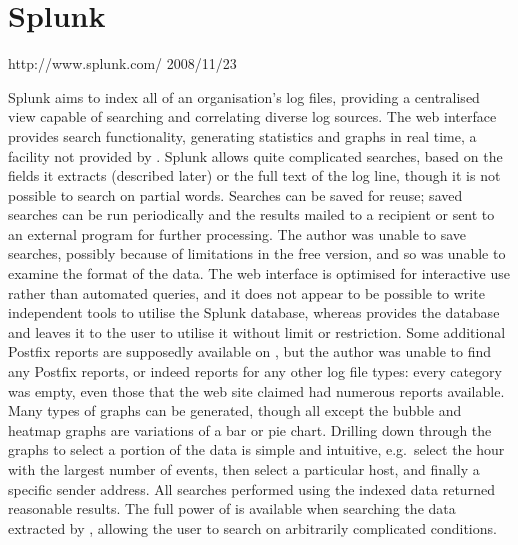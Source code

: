\section{Splunk}

\label{Splunk review}

{http://www.splunk.com/}
{2008/11/23}

Splunk aims to index all of an organisation's log files, providing a
centralised view capable of searching and correlating diverse log sources.
The web interface provides search functionality, generating statistics and
graphs in real time, a facility not provided by \parsername{}.  Splunk
allows quite complicated searches, based on the fields it extracts
(described later) or the full text of the log line, though it is not
possible to search on partial words.  Searches can be saved for reuse;
saved searches can be run periodically and the results mailed to a
recipient or sent to an external program for further processing.  The
author was unable to save searches, possibly because of limitations in the
free version, and so was unable to examine the format of the data.  The web
interface is optimised for interactive use rather than automated queries,
and it does not appear to be possible to write independent tools to utilise
the Splunk database, whereas \parsername{} provides the database and leaves
it to the user to utilise it without limit or restriction.  Some additional
Postfix reports are supposedly available on
, but the author was
unable to find any Postfix reports, or indeed reports for any other log
file types: every category was empty, even those that the web site claimed
had numerous reports available.  Many types of graphs can be generated,
though all except the bubble and heatmap graphs are variations of a bar or
pie chart.  Drilling down through the graphs to select a portion of the
data is simple and intuitive, e.g.\ select the hour with the largest number
of events, then select a particular host, and finally a specific sender
address.  All searches performed using the indexed data returned reasonable
results.  The full power of  is available when searching the
data extracted by \parsername{}, allowing the user to search on arbitrarily
complicated conditions.

